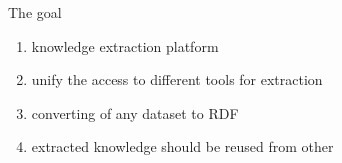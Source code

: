 \begin{frame}{The goal}

\begin{enumerate}
		\item knowledge extraction platform
		\item unify the access to different tools for extraction 
		\item converting of any dataset to RDF
		\item extracted knowledge should be reused from other
	\end{enumerate}
\end{frame}